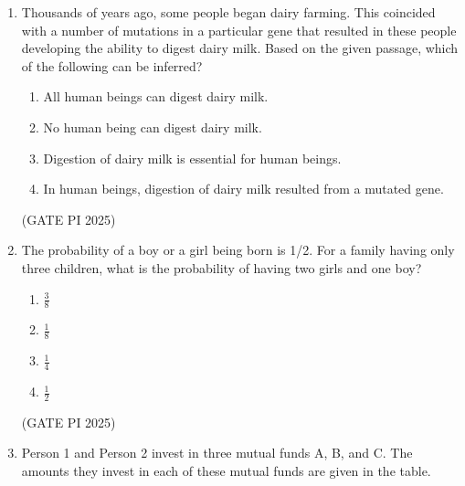 \documentclass[journal,12pt,onecolumn]{IEEEtran}
\theoremstyle{remark}
\begin{document}
\begin{enumerate}
\begin{multicols}{4}
\begin{enumerate}
    \item 45,000
    \item 49,500
    \item 51,750
    \item 54,000
\end{enumerate}
\end{multicols}

\hfill (GATE PI 2025)

\item Thousands of years ago, some people began dairy farming. This coincided with a number of mutations in a particular gene that resulted in these people developing the ability to digest dairy milk.
Based on the given passage, which of the following can be inferred?

\begin{enumerate}
    \item All human beings can digest dairy milk.
    \item No human being can digest dairy milk.
    \item Digestion of dairy milk is essential for human beings.
    \item In human beings, digestion of dairy milk resulted from a mutated gene.
\end{enumerate}

\hfill (GATE PI 2025)

\item The probability of a boy or a girl being born is 1/2. For a family having only three children, what is the probability of having two girls and one boy?

\begin{multicols}{4}
\begin{enumerate}
    \item $\frac{3}{8}$
    \item $\frac{1}{8}$
    \item $\frac{1}{4}$
    \item $\frac{1}{2}$
\end{enumerate}
\end{multicols}

\hfill (GATE PI 2025)

\item Person 1 and Person 2 invest in three mutual funds A, B, and C. The amounts they invest in each of these mutual funds are given in the table.

       


\end{enumerate}
\end{document}
